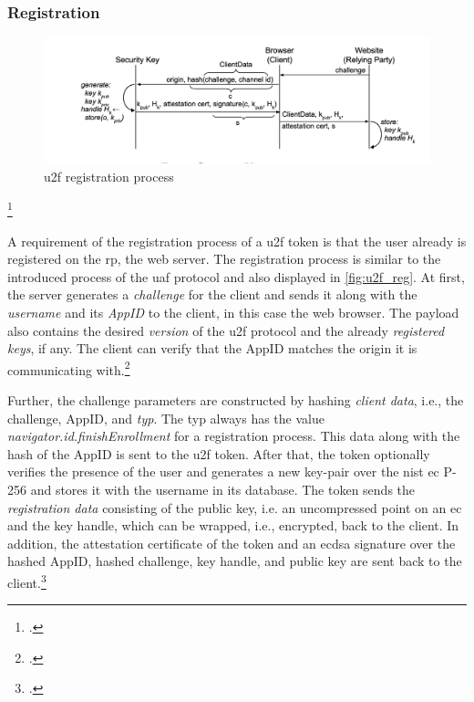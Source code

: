 \subsubsection{Registration}

\begin{figure}[hbt]
	\centering
	\includegraphics[width=\textwidth]{pics/u2f_reg}
	\caption[\gls{u2f} registration process]{\gls{u2f} registration process\footnotemark}
	\label{fig:u2f_reg}
\end{figure}
\footcitetexts[Source: diagram by author, based on][69]{10.1007/978-3-319-75650-9_5}[][428]{10.1007/978-3-662-54970-4_25}

A requirement of the registration process of a \gls{u2f} token is that the user already is registered on the \gls{rp}, the web server. The registration process is similar to the introduced process of the \gls{uaf} protocol and also displayed in \autoref{fig:u2f_reg}. At first, the server generates a \textit{challenge} for the client and sends it along with the \textit{username} and its \textit{AppID} to the client, in this case the web browser. The payload also contains the desired \textit{version} of the \gls{u2f} protocol and the already \textit{registered keys}, if any. The client can verify that the AppID matches the origin it is communicating with.\footcites[See][4--5]{u2f-js-api}[See][431]{10.1007/978-3-662-54970-4_25}

Further, the challenge parameters are constructed by hashing \textit{client data}, i.e., the challenge, AppID, and \textit{typ}. The typ always has the value \textit{navigator.id.finishEnrollment} for a registration process. This data along with the hash of the AppID is sent to the \gls{u2f} token. After that, the token optionally verifies the presence of the user and generates a new key-pair over the \gls{nist} \gls{ec} P-256 and stores it with the username in its database. The token sends the \textit{registration data} consisting of the public key, i.e. an uncompressed point on an \gls{ec} and the key handle, which can be wrapped, i.e., encrypted, back to the client. In addition, the attestation certificate of the token and an \gls{ecdsa} signature over the hashed AppID, hashed challenge, key handle, and public key are sent back to the client.\footcites[See][4--5]{u2f-raw-message}[See][70]{10.1007/978-3-319-75650-9_5}

